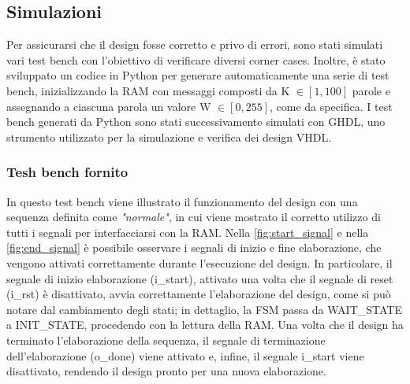 \documentclass[11pt,a4paper]{article}
\newcommand{\m}[1]{{\fontfamily{zi4}\selectfont #1}}
\begin{document}
\subsection{Simulazioni}
Per assicurarsi che il design fosse corretto e privo di errori, sono stati simulati vari test bench con l'obiettivo di verificare diversi corner cases. Inoltre, è stato sviluppato un codice in Python per generare automaticamente una serie di test bench, inizializzando la RAM con messaggi composti da \m{K} $\in [1, 100]$ parole e assegnando a ciascuna parola un valore \m{W} $\in [0, 255]$, come da specifica. I test bench generati da Python sono stati successivamente simulati con GHDL, uno strumento utilizzato per la simulazione e verifica dei design VHDL.

\subsubsection{Tesh bench fornito}
In questo test bench viene illustrato il funzionamento del design con una sequenza definita come \textit{"normale"}, in cui viene mostrato il corretto utilizzo di tutti i segnali per interfacciarsi con la RAM. Nella \autoref{fig:start_signal} e nella \autoref{fig:end_signal} è possibile osservare i segnali di inizio e fine elaborazione, che vengono attivati correttamente durante l'esecuzione del design. In particolare, il segnale di inizio elaborazione (\m{i\_start}), attivato una volta che il segnale di reset (\m{i\_rst}) è disattivato, avvia correttamente l'elaborazione del design, come si può notare dal cambiamento degli stati; in dettaglio, la FSM passa da \m{WAIT\_STATE} a \m{INIT\_STATE}, procedendo con la lettura della RAM. Una volta che il design ha terminato l'elaborazione della sequenza, il segnale di terminazione dell'elaborazione (\m{o\_done}) viene attivato e, infine, il segnale \m{i\_start} viene disattivato, rendendo il design pronto per una nuova elaborazione.

\vspace{0.5em}
\end{document}
